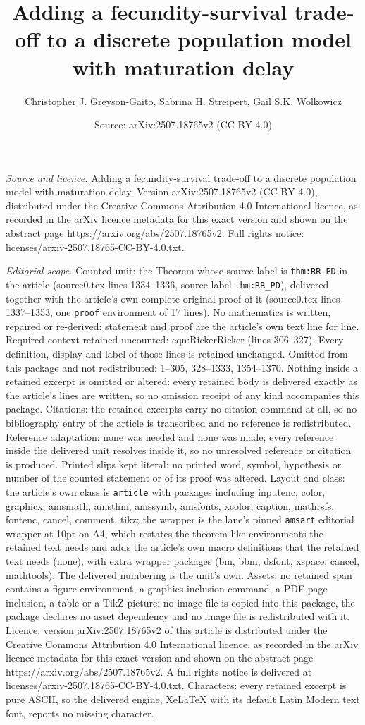 \documentclass[10pt,a4paper]{amsart}
\title[Adding a fecundity-survival trade-off to a discrete populati]{Adding a fecundity-survival trade-off to a discrete population model with maturation delay}
\author{Christopher J. Greyson-Gaito, Sabrina H. Streipert, Gail S.K. Wolkowicz}
\date{Source: arXiv:2507.18765v2 (CC BY 4.0)}
\begin{document}
\maketitle

\noindent\emph{Source and licence.} Adding a fecundity-survival trade-off to a discrete population model with maturation delay. Version arXiv:2507.18765v2 (CC BY 4.0), distributed under the Creative Commons Attribution 4.0 International licence, as recorded in the arXiv licence metadata for this exact version and shown on the abstract page https://arxiv.org/abs/2507.18765v2. Full rights notice: licenses/arxiv-2507.18765-CC-BY-4.0.txt.\par\smallskip

\noindent\textit{Editorial scope.} Counted unit: the Theorem whose source label is \texttt{thm:RR\_PD} in the article (source0.tex lines 1334--1336, source label \texttt{thm:RR\_PD}), delivered together with the article's own complete original proof of it (source0.tex lines 1337--1353, one \texttt{proof} environment of 17 lines). No mathematics is written, repaired or re-derived: statement and proof are the article's own text line for line. Required context retained uncounted: eqn:RickerRicker (lines 306--327). Every definition, display and label of those lines is retained unchanged. Omitted from this package and not redistributed: 1--305, 328--1333, 1354--1370. Nothing inside a retained excerpt is omitted or altered: every retained body is delivered exactly as the article's lines are written, so no omission receipt of any kind accompanies this package. Citations: the retained excerpts carry no citation command at all, so no bibliography entry of the article is transcribed and no reference is redistributed. Reference adaptation: none was needed and none was made; every reference inside the delivered unit resolves inside it, so no unresolved reference or citation is produced. Printed slips kept literal: no printed word, symbol, hypothesis or number of the counted statement or of its proof was altered. Layout and class: the article's own class is \texttt{article} with packages including inputenc, color, graphicx, amsmath, amsthm, amssymb, amsfonts, xcolor, caption, mathrsfs, fontenc, cancel, comment, tikz; the wrapper is the lane's pinned \texttt{amsart} editorial wrapper at 10pt on A4, which restates the theorem-like environments the retained text needs and adds the article's own macro definitions that the retained text needs (none), with extra wrapper packages (bm, bbm, dsfont, xspace, cancel, mathtools). The delivered numbering is the unit's own. Assets: no retained span contains a figure environment, a graphics-inclusion command, a PDF-page inclusion, a table or a TikZ picture; no image file is copied into this package, the package declares no asset dependency and no image file is redistributed with it. Licence: version arXiv:2507.18765v2 of this article is distributed under the Creative Commons Attribution 4.0 International licence, as recorded in the arXiv licence metadata for this exact version and shown on the abstract page https://arxiv.org/abs/2507.18765v2. A full rights notice is delivered at licenses/arxiv-2507.18765-CC-BY-4.0.txt. Characters: every retained excerpt is pure ASCII, so the delivered engine, XeLaTeX with its default Latin Modern text font, reports no missing character.
\end{document}
